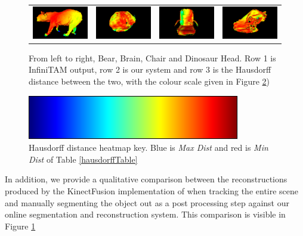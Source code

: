 \begin{figure}[!t]
\begin{tabular}{cccc}
		\includegraphics[width=3cm]{hausdorff/bear.png}&
		\includegraphics[width=3cm]{hausdorff/brain.png}&
		\includegraphics[width=3cm]{hausdorff/chair.png}&
		\includegraphics[width=3cm]{hausdorff/dino.png}\\
	\end{tabular}
	\vspace{-3mm}
	\caption{
		From left to right, Bear, Brain, Chair and Dinosaur Head. Row 1 is InfiniTAM output, row 2 is our system and row 3 is the Hausdorff distance between the two, with the colour scale 
		given in Figure \ref{fig:colour_range})
	}
	\vspace{-5mm}
	\label{fig:demo}
\end{figure}

\begin{figure}
	\centering
	\includegraphics[scale=0.5]{hausdorff/colour_range.png}
	\caption{Hausdorff distance heatmap key. Blue is \textit{Max Dist} and red is \textit{Min Dist} of Table \ref{hausdorffTable}}
	\label{fig:colour_range}
\end{figure}

In addition, we provide a qualitative comparison between the reconstructions produced by the KinectFusion implementation of \cite{Prisacariu2014} when 
tracking the entire scene and manually segmenting the object out as a post processing step against our online segmentation and reconstruction system. This 
comparison is visible in Figure \ref{fig:demo}

